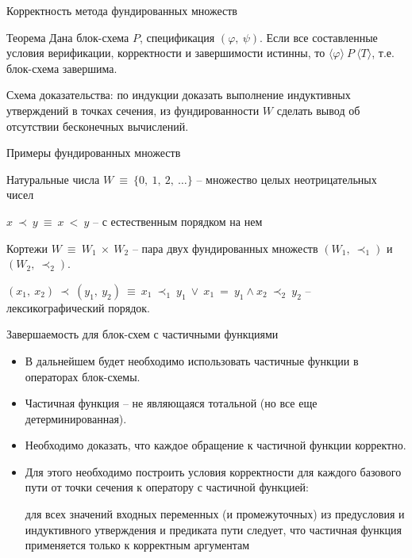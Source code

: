 \documentclass[hyperref={unicode=true}]{beamer}
\begin{document}
	\begin{frame}{Корректность метода фундированных множеств}

	\begin{block}{Теорема}
	Дана блок-схема $P$, спецификация $(\varphi,~\psi)$. Если все составленные условия верификации, корректности и завершимости истинны, то $\langle\varphi\rangle~P~\langle T \rangle$, т.е. блок-схема завершима.
	\end{block}

    Схема доказательства: по индукции доказать выполнение индуктивных утверждений в точках сечения, из фундированности $W$ сделать вывод об отсутствии бесконечных вычислений.
	\end{frame}

	\begin{frame}{Примеры фундированных множеств}
	\begin{block}{Натуральные числа}
	$W~\equiv~\{0,~1,~2,~\ldots\}$ -- множество целых неотрицательных чисел

	$x~\prec~y~\equiv~x~<~y$ -- с естественным порядком на нем
	\end{block}
	\begin{block}{Кортежи}
	$W~\equiv~W_1~\times~W_2$ -- пара двух фундированных множеств $(W_1,~\prec_1)$ и $(W_2,~\prec_2)$.

	$(x_1,~x_2)~\prec~(y_1,~y_2) ~\equiv~ x_1~\prec_1~y_1~\lor~x_1~=~y_1 \land x_2~\prec_2~y_2$ -- лексикографический порядок.
	\end{block}
	\end{frame}

    \begin{frame}{Завершаемость для блок-схем с частичными функциями}
    \begin{itemize}
    \item
    В дальнейшем будет необходимо использовать частичные функции
    в операторах блок-схемы.
    \item
    Частичная функция -- не являющаяся тотальной (но все еще детерминированная).
    \item
    Необходимо доказать, что каждое обращение к частичной функции корректно.
    \item
    Для этого необходимо построить условия корректности
    для каждого базового пути от точки сечения к оператору с частичной функцией:
    \begin{block}{}
    для всех значений входных переменных (и промежуточных)
    из предусловия и индуктивного утверждения и предиката пути следует,
    что частичная функция применяется только к корректным аргументам
    \end{block}
    \end{itemize}
    \end{frame}
\end{document}
